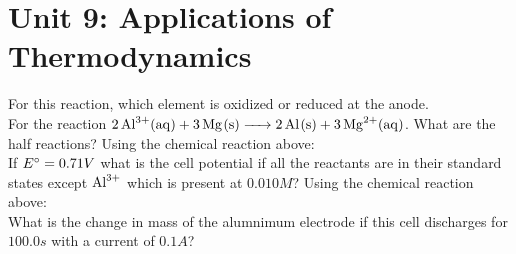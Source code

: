 \documentclass[../main.tex]{subfiles}
\begin{document}
\section{Unit 9: Applications of Thermodynamics}
\ProblemSet
For this reaction, which element is oxidized or reduced at the anode.\\
\ProblemSet
For the reaction \(\ce{2Al^{3+}(aq) + 3Mg(s) -> 2Al(s) + 3Mg^{2+}(aq)}\). What are the half reactions?
\ProblemSet
Using the chemical reaction above:\\
If \(E\degree =0.71V\) what is the cell potential if all the reactants are in their standard states except \(\ce{Al^{3+}}\) which is present at \(0.010M\)?
\ProblemSet
Using the chemical reaction above:\\
What is the change in mass of the alumnimum electrode if this cell discharges for \(100.0s\) with a current of \(0.1A\)?
\end{document}
